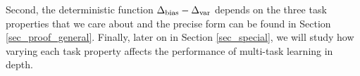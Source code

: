 Second, the deterministic function $\Delta_{\text{bias}} - \Delta_{\text{var}}$ depends on the three task properties that we care about and the precise form can be found in Section \ref{sec_proof_general}.
Finally, later on in Section \ref{sec_special}, we will study how varying each task property affects the performance of multi-task learning in depth.

%
%
%

